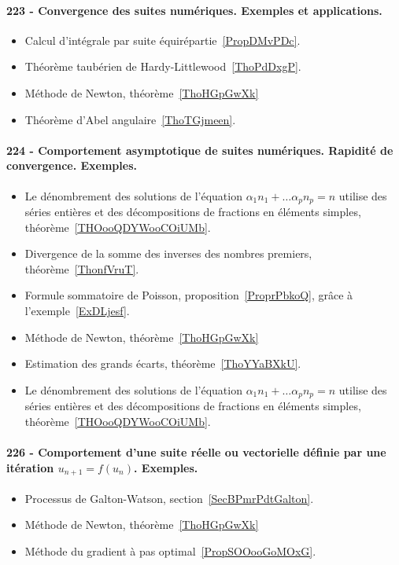 \paragraph{223 - Convergence des suites numériques. Exemples et applications.}
\begin{itemize}
	\item Calcul d'intégrale par suite équirépartie~\ref{PropDMvPDc}.
	\item Théorème taubérien de Hardy-Littlewood~\ref{ThoPdDxgP}.
	\item Méthode de Newton, théorème~\ref{ThoHGpGwXk}
	\item Théorème d'Abel angulaire~\ref{ThoTGjmeen}.
\end{itemize}
\paragraph{224 - Comportement asymptotique de suites numériques. Rapidité de convergence. Exemples.}
\begin{itemize}
	\item Le dénombrement des solutions de l'équation \( \alpha_1 n_1+\ldots \alpha_pn_p=n\) utilise des séries entières et des décompositions de fractions en éléments simples, théorème~\ref{THOooQDYWooCOiUMb}.
	\item Divergence de la somme des inverses des nombres premiers, théorème~\ref{ThonfVruT}.
	\item Formule sommatoire de Poisson, proposition~\ref{ProprPbkoQ}, grâce à l'exemple~\ref{ExDLjesf}.
	\item Méthode de Newton, théorème~\ref{ThoHGpGwXk}
	\item Estimation des grands écarts, théorème~\ref{ThoYYaBXkU}.
	\item Le dénombrement des solutions de l'équation \( \alpha_1 n_1+\ldots \alpha_pn_p=n\) utilise des séries entières et des décompositions de fractions en éléments simples, théorème~\ref{THOooQDYWooCOiUMb}.
\end{itemize}
\paragraph{226 - Comportement d’une suite réelle ou vectorielle définie par une itération \( u_{n+1}=f(u_n)\). Exemples.}
\begin{itemize}
	\item Processus de Galton-Watson, section~\ref{SecBPmrPdtGalton}.
	\item Méthode de Newton, théorème~\ref{ThoHGpGwXk}
	\item Méthode du gradient à pas optimal~\ref{PropSOOooGoMOxG}.
\end{itemize}
